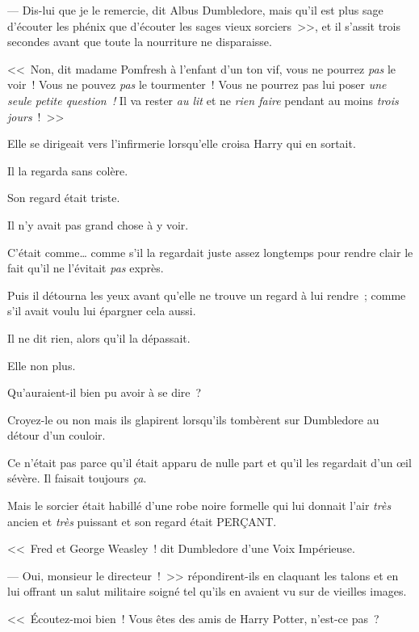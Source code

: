 --- Dis-lui que je le remercie, dit Albus Dumbledore, mais qu'il est plus sage d'écouter les phénix que d'écouter les sages vieux sorciers~>>, et il s'assit trois secondes avant que toute la nourriture ne disparaisse.


<<~Non, dit madame Pomfresh à l'enfant d'un ton vif, vous ne pourrez \emph{pas} le voir~! Vous ne pouvez \emph{pas} le tourmenter~! Vous ne pourrez pas lui poser \emph{une seule petite question~!} Il va rester \emph{au lit} et ne \emph{rien faire} pendant au moins \emph{trois jours}~!~>>


Elle se dirigeait vers l'infirmerie lorsqu'elle croisa Harry qui en sortait.

Il la regarda sans colère.

Son regard était triste.

Il n'y avait pas grand chose à y voir.

C'était comme… comme s'il la regardait juste assez longtemps pour rendre clair le fait qu'il ne l'évitait \emph{pas} exprès.

Puis il détourna les yeux avant qu'elle ne trouve un regard à lui rendre~; comme s'il avait voulu lui épargner cela aussi.

Il ne dit rien, alors qu'il la dépassait.

Elle non plus.

Qu'auraient-il bien pu avoir à se dire~?


Croyez-le ou non mais ils glapirent lorsqu'ils tombèrent sur Dumbledore au détour d'un couloir.

Ce n'était pas parce qu'il était apparu de nulle part et qu'il les regardait d'un œil sévère. Il faisait toujours \emph{ça}.

Mais le sorcier était habillé d’une robe noire formelle qui lui donnait l'air \emph{très} ancien et \emph{très} puissant et son regard était PERÇANT.

<<~Fred et George Weasley~! dit Dumbledore d'une Voix Impérieuse.

--- Oui, monsieur le directeur~!~>> répondirent-ils en claquant les talons et en lui offrant un salut militaire soigné tel qu'ils en avaient vu sur de vieilles images.

<<~Écoutez-moi bien~! Vous êtes des amis de Harry Potter, n'est-ce pas~?

